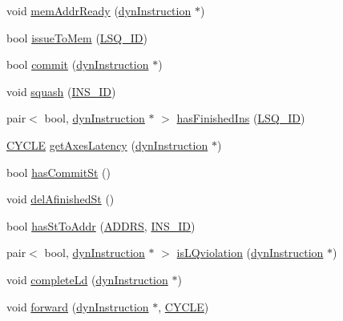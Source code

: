 \begin{DoxyCompactItemize}
\item 
void \hyperlink{classo3__memManager_a401c114902989a9296444795c28cd5fb}{memAddrReady} (\hyperlink{classdynInstruction}{dynInstruction} $\ast$)
\item 
bool \hyperlink{classo3__memManager_a124d7a6a84cf5cbc75a171a773784fbb}{issueToMem} (\hyperlink{global_2global_8h_a3bb5a7f1114a20672e012bf0dfe5fb24}{LSQ\_\-ID})
\item 
bool \hyperlink{classo3__memManager_ae95cfddde7894d5cd3a865c857faba54}{commit} (\hyperlink{classdynInstruction}{dynInstruction} $\ast$)
\item 
void \hyperlink{classo3__memManager_afdb4d5b4146efa960976f66c3ccd358e}{squash} (\hyperlink{global_2global_8h_a1883c47d0023d0f200e1d86eced6a070}{INS\_\-ID})
\item 
pair$<$ bool, \hyperlink{classdynInstruction}{dynInstruction} $\ast$ $>$ \hyperlink{classo3__memManager_a8be15f63b5d876cb3ab99b7eec4c643c}{hasFinishedIns} (\hyperlink{global_2global_8h_a3bb5a7f1114a20672e012bf0dfe5fb24}{LSQ\_\-ID})
\item 
\hyperlink{global_2global_8h_a7e19a550ec11d1ed921deb20c22efb5b}{CYCLE} \hyperlink{classo3__memManager_aeef4a4447f1777bb2a4c63920796c1a4}{getAxesLatency} (\hyperlink{classdynInstruction}{dynInstruction} $\ast$)
\item 
bool \hyperlink{classo3__memManager_a408c667a491a930d66fd1a0f7e8e9ec6}{hasCommitSt} ()
\item 
void \hyperlink{classo3__memManager_a7d75c416d7ce73b8b1bb2203b8ebdb4e}{delAfinishedSt} ()
\item 
bool \hyperlink{classo3__memManager_afcbdb28a588d6b0990761dfe751cb07d}{hasStToAddr} (\hyperlink{binaryTranslator_2frontend_2stInstruction_8h_a7ea74bb9ffd2e4d41550ae2383dd25bc}{ADDRS}, \hyperlink{global_2global_8h_a1883c47d0023d0f200e1d86eced6a070}{INS\_\-ID})
\item 
pair$<$ bool, \hyperlink{classdynInstruction}{dynInstruction} $\ast$ $>$ \hyperlink{classo3__memManager_afdb19a44895888ec99fb6495dccc1dcc}{isLQviolation} (\hyperlink{classdynInstruction}{dynInstruction} $\ast$)
\item 
void \hyperlink{classo3__memManager_aa2bb5f372b197474b76c8f6ae3531698}{completeLd} (\hyperlink{classdynInstruction}{dynInstruction} $\ast$)
\item 
void \hyperlink{classo3__memManager_a9ccbaf680579ad2517f01a92dbe147e5}{forward} (\hyperlink{classdynInstruction}{dynInstruction} $\ast$, \hyperlink{global_2global_8h_a7e19a550ec11d1ed921deb20c22efb5b}{CYCLE})
\end{DoxyCompactItemize}


